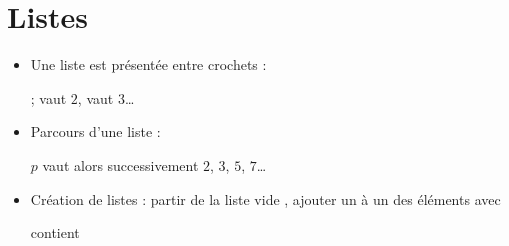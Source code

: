 \section{Listes}

\begin{frame}


\pause
\begin{itemize}
  
  \item Une liste est présentée entre crochets :
   \pause
  
   ;
   vaut $2$,   vaut $3$\ldots
  \pause

  \item Parcours d'une liste : 
  
  $p$ vaut alors successivement $2$, $3$, $5$, $7$\ldots
  \pause
  \item Création de listes :  partir de la liste vide \codeinline{[]}, \pause
  ajouter un à un des éléments avec  \pause
  
  
  
  
   contient  \codeinline{[ (2,3), (7,-1) ]}

\end{itemize}

\end{frame}


